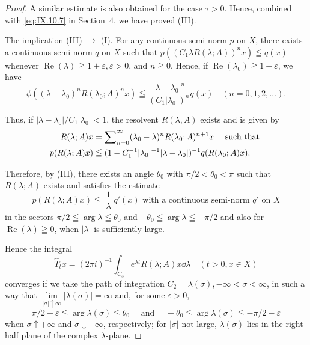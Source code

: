 \begin{proof}
A similar estimate is also obtained for the case $\tau > 0$. Hence, combined with \eqref{eq:IX.10.7} in Section~\hyperref[sec:IX.4]{$4$}, we have proved (III). 

The implication (III) $\rightarrow$ (I). For any continuous semi-norm $p$ on $X$, there exists a continuous semi-norm $q$ on $X$ such that $p((C_1\lambda R(\lambda;A))^n x)\leqq q(x)$ whenever $\operatorname{Re}(\lambda)\geqq 1 + \varepsilon, \varepsilon >0$, and $n\geqq 0$. Hence, if $\operatorname{Re}(\lambda_0)\geqq 1 + \varepsilon$, we have 
\[
\phi \left((\lambda - \lambda_{0}) ^{n} R (\lambda_{0}; A) ^{n} x\right) \leqq \frac {| \lambda - \lambda_{0} | ^{n}}{(C _{1} | \lambda_{0} |) ^{n}} q (x) \quad (n = 0, 1, 2, \dots).
\]

Thus, if $|\lambda - \lambda_0| / C_1 |\lambda_0| < 1$, the resolvent $R(\lambda, A)$ exists and is given by 
\begin{align}
R (\lambda ; A) x& = \sum\limits_{n=0} ^{\infty} (\lambda_{0} - \lambda) ^{n} R (\lambda_{0}; A) ^{n+1} x \quad \text{ such that } \notag \\
p (R (\lambda ; A) x)& \leqq (1 - C _{1} ^{-1} | \lambda_{0} | ^{-1} | \lambda - \lambda_{0} |) ^{-1} q (R (\lambda_{0}; A) x). \notag
\end{align}

Therefore, by (III), there exists an angle $\theta_0$ with $\pi / 2 < \theta_0 < \pi$ such that $R(\lambda; A)$ exists and satisfies the estimate 
\begin{equation}\label{eq:IX.10.5}
p(R(\lambda; A)x) \leqq \frac{1}{|\lambda|} q'(x) \text{ with a continuous semi-norm } q' \text{ on } X
\end{equation}
in the sectors $\pi / 2 \leqq \arg \lambda \leqq \theta_0$ and $-\theta_0 \leqq \arg \lambda \leqq -\pi / 2$ and also for $\operatorname{Re}(\lambda) \geqq 0$, when $|\lambda|$ is sufficiently large. 

Hence the integral 
\begin{equation}\label{eq:IX.10.6}
\hat {T} _{t} x = (2 \pi i) ^{-1} \int_ {C _{3}} e ^{\lambda t} R (\lambda ; A) x \dd \lambda \quad (t > 0, x \in X)
\end{equation}
converges if we take the path of integration $C_2 = \lambda(\sigma), -\infty < \sigma < \infty$, in such a way that $\lim\limits_{|\sigma| \uparrow \infty} |\lambda(\sigma)| = \infty$ and, for some $\varepsilon > 0$, 
\[
\pi / 2 + \varepsilon \leqq \arg \lambda (\sigma) \leqq \theta_{0} \quad \text{ and } \quad - \theta_{0} \leqq \arg \lambda (\sigma) \leqq - \pi / 2 - \varepsilon
\]
when $\sigma \uparrow +\infty$ and $\sigma \downarrow -\infty$, respectively; for $|\sigma|$ not large, $\lambda (\sigma)$ lies in the right half plane of the complex $\lambda$-plane. 


\end{proof}
